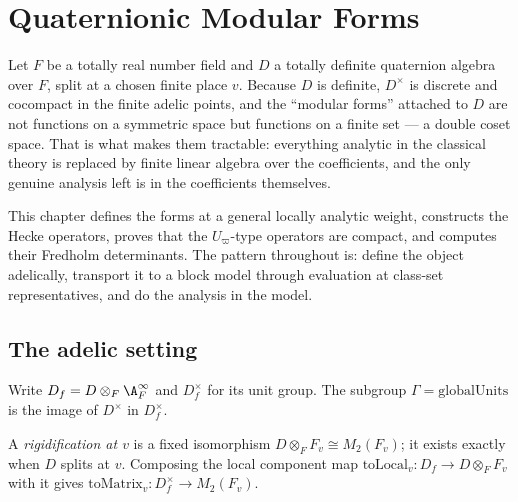\chapter{Quaternionic Modular Forms}
\label{chap:qmf}

Let $F$ be a totally real number field and $D$ a totally definite quaternion algebra over $F$,
split at a chosen finite place $v$.  Because $D$ is definite, $D^\times$ is discrete and
cocompact in the finite adelic points, and the ``modular forms'' attached to $D$ are not
functions on a symmetric space but functions on a finite set --- a double coset space.  That is
what makes them tractable: everything analytic in the classical theory is replaced by finite
linear algebra over the coefficients, and the only genuine analysis left is in the coefficients
themselves.

This chapter defines the forms at a general locally analytic weight, constructs the Hecke
operators, proves that the $U_\varpi$-type operators are compact, and computes their Fredholm
determinants.  The pattern throughout is: define the object adelically, transport it to a block
model through evaluation at class-set representatives, and do the analysis in the model.

\section{The adelic setting}

\begin{definition}
  \label{def:dfx}
  \leanok
  Write $D_f = D \otimes_F \A_F^\infty$ and $D_f^\times$ for its unit group.  The subgroup
  $\Gamma = \mathrm{globalUnits}$ is the image of $D^\times$ in $D_f^\times$.
\end{definition}

\begin{definition}
  \label{def:rigidification}
  \leanok
  A \emph{rigidification at $v$} is a fixed isomorphism $D \otimes_F F_v \cong M_2(F_v)$; it
  exists exactly when $D$ splits at $v$.  Composing the local component map $\mathrm{toLocal}_v :
  D_f \to D \otimes_F F_v$ with it gives $\mathrm{toMatrix}_v : D_f^\times \to M_2(F_v)$.
\end{definition}

